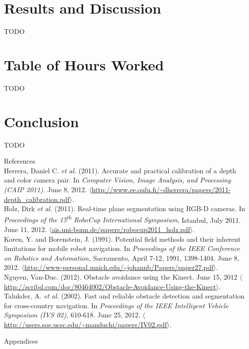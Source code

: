 \documentclass[12pt]{report}
\renewcommand{\Large}{\fontsize{18pt}{18pt}\selectfont}
\renewcommand{\large}{\fontsize{14pt}{14pt}\selectfont}
\begin{document}
\section{Results and Discussion}
TODO

\section{Table of Hours Worked}
TODO

\section{Conclusion}
TODO

\clearpage
{}
{}
{\large References} \\
\linebreak
Herrera, Daniel C. \textit{et al.} (2011). Accurate and practical calibration of a depth and color camera pair. In \textit{Computer Vision, Image Analysis, and Processing (CAIP 2011).} June 8, 2012. $\langle$\url{http://www.ee.oulu.fi/~dherrera/papers/2011-depth_calibration.pdf}$\rangle$.\\
Holz, Dirk \textit{et al.} (2011). Real-time plane segmentation using RGB-D cameras. In \textit{Proceedings of the 15\textsuperscript{th} RoboCup International Symposium,} Istanbul, July 2011. June 11, 2012. $\langle$\url{ais.uni-bonn.de/papers/robocup2011_holz.pdf}$\rangle$.\\
Koren, Y. and Borenstein, J. (1991). Potential field methods and their inherent limitations for mobile robot navigation. In \textit{Proceedings of the IEEE Conference on Robotics and Automation,} Sacramento, April 7-12, 1991, 1398-1404. June 8, 2012. $\langle$\url{http://www-personal.umich.edu/~johannb/Papers/paper27.pdf}$\rangle$.\\
Nguyen, Van-Duc. (2012). Obstacle avoidance using the Kinect. June 15, 2012 $\langle$\url{http://scribd.com/doc/80464002/Obstacle-Avoidance-Using-the-Kinect}$\rangle$.
Talukder, A. \textit{et al.} (2002). Fast and reliable obstacle detection and segmentation for cross-country navigation. In \textit{Proceedings of the IEEE Intelligent Vehicle Symposium (IVS 02),} 610-618. June 25, 2012. $\langle$\url{http://users.soe.ucsc.edu/~manduchi/papers/IV02.pdf}$\rangle$.

\clearpage
{\Large Appendices} \\
\appendix
\end{document}
